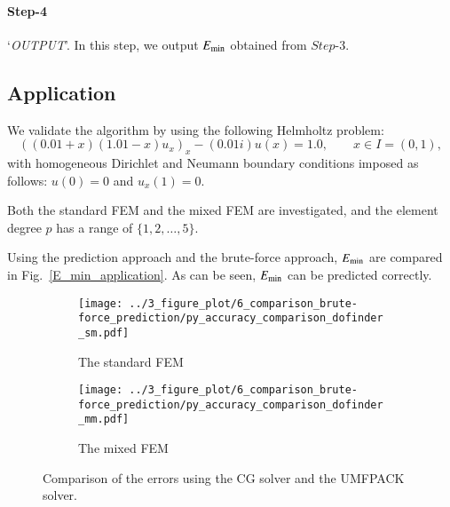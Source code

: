 \documentclass[review,3p]{elsarticle}
\begin{document}
\paragraph{Step-4} `\textit{OUTPUT}'. In this step, we output $E_{\rm min}$ obtained from $Step$-3.

\subsection{Application}		\label{section_validation}

We validate the algorithm by using the following Helmholtz problem\citep{chernetsky2010effect}:
\begin{equation}
  \left((0.01+x)(1.01-x) u_x \right)_x -(0.01i) u(x) = 1.0,\qquad x \in I = (0,1),	\label{1D_Helmholtz_equation_application}
\end{equation}
with homogeneous Dirichlet and Neumann boundary conditions imposed as follows: $u(0)=0$ and $u_x(1)=0$.

Both the standard FEM and the mixed FEM are investigated, and the element degree $p$ has a range of $\{1, 2, \ldots, 5\}$.

Using the prediction approach and the brute-force approach, $E_{\rm min}$ are compared in Fig.~\ref{E_min_application}. As can be seen, $E_{\rm min}$ can be predicted correctly.


\begin{figure}[!ht]
	\hspace{1cm}
    \begin{subfigure}{5.5cm}
        \texttt{[image: ../3\_figure\_plot/6\_comparison\_brute-force\_prediction/py\_accuracy\_comparison\_dofinder\_sm.pdf]}
        \caption{The standard FEM}
        \label{py_bench_Pois_SM_error_solution_strategy_solu}
    \end{subfigure}
    \hspace{0.8cm}
    \begin{subfigure}{5.5cm}	                		 	
        \texttt{[image: ../3\_figure\_plot/6\_comparison\_brute-force\_prediction/py\_accuracy\_comparison\_dofinder\_mm.pdf]}
        \caption{The mixed FEM}
        \label{py_bench_Pois_MM_error_solution_strategy_solu}
    \end{subfigure}
\caption{Comparison of the errors using the CG solver and the UMFPACK solver.}
\label{py_bench_Pois_error_solution_strategy}
\end{figure}
\end{document}
